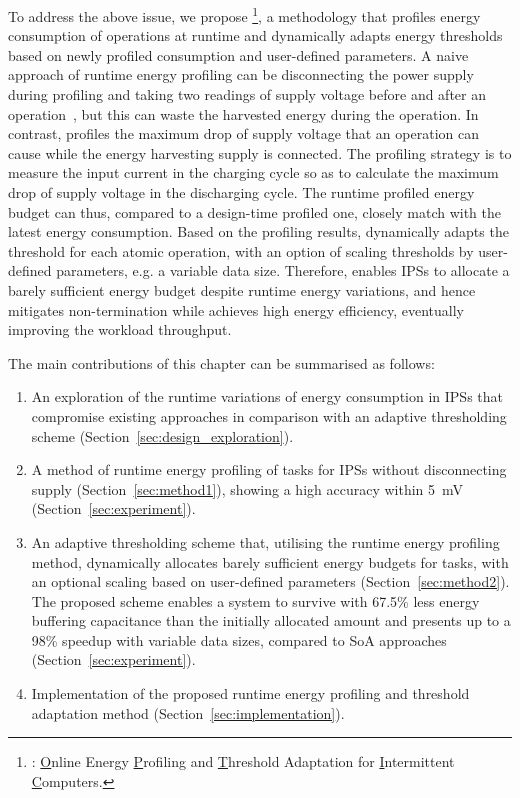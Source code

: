 To address the above issue, we propose \nn{}\footnote{\nn{}: \underline{O}nline Energy \underline{P}rofiling and \underline{T}hreshold Adaptation for \underline{I}ntermittent \underline{C}omputers. }, a methodology that profiles energy consumption of operations at runtime and dynamically adapts energy thresholds based on newly profiled consumption and user-defined parameters. 
A naive approach of runtime energy profiling can be disconnecting the power supply during profiling and taking two readings of supply voltage before and after an operation~\cite{zhan2020adaptive}, but this can waste the harvested energy during the operation. 
In contrast, \nn{} profiles the maximum drop of supply voltage that an operation can cause while the energy harvesting supply is connected. 
The profiling strategy is to measure the input current in the charging cycle so as to calculate the maximum drop of supply voltage in the discharging cycle. 
The runtime profiled energy budget can thus, compared to a design-time profiled one, closely match with the latest energy consumption. 
Based on the profiling results, \nn{} dynamically adapts the threshold for each atomic operation, with an option of scaling thresholds by user-defined parameters, e.g. a variable data size.
Therefore, \nn{} enables IPSs to allocate a barely sufficient energy budget despite runtime energy variations, and hence mitigates non-termination while achieves high energy efficiency, eventually improving the workload throughput.

The main contributions of this chapter can be summarised as follows:

\begin{enumerate}
    \item An exploration of the runtime variations of energy consumption in IPSs that compromise existing approaches in comparison with an adaptive thresholding scheme (Section~\ref{sec:design_exploration}). 
    \item A method of runtime energy profiling of tasks for IPSs without disconnecting supply (Section~\ref{sec:method1}), showing a high accuracy within \SI{5}{\milli\volt} (Section~\ref{sec:experiment}).
    \item An adaptive thresholding scheme that, utilising the runtime energy profiling method, dynamically allocates barely sufficient energy budgets for tasks, with an optional scaling based on user-defined parameters (Section~\ref{sec:method2}). The proposed scheme enables a system to survive with 67.5\% less energy buffering capacitance than the initially allocated amount and presents up to a 98\% speedup with variable data sizes, compared to SoA approaches (Section~\ref{sec:experiment}).
    \item Implementation of the proposed runtime energy profiling and threshold adaptation method (Section~\ref{sec:implementation}).
\end{enumerate}